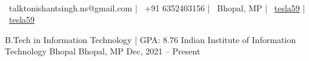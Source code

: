 \documentclass[]{awesome-cv}
\begin{document}
\begin{center}
      \\
    \vspace{2mm}
    {\faEnvelope\ talktonishantsingh.ns@gmail.com} | {\faMobile\ +91 6352403156} | {\faMapMarker\ Bhopal, MP} | {\faLinkedinSquare\ \href{https://www.linkedin.com/in/tesla59/}{tesla59}} | {\faGithubSquare\ \href{https://www.github.com/tesla59/}{tesla59}} \
\end{center}
\vspace{-3mm}
\begin{cventries}
    \cventry
    {B.Tech in Information Technology | GPA: 8.76 }
    {Indian Institute of Information Technology Bhopal}
    {Bhopal, MP}
    {Dec, 2021 – Present}
    {}
\end{cventries}
\vspace{-9mm}
\end{document}
